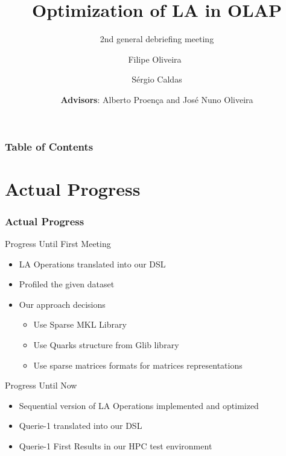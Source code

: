 \documentclass{beamer}
\title{Optimization of LA in OLAP}
\subtitle{2nd general debriefing meeting}
\author{ Filipe Oliveira\ \and Sérgio Caldas}
\date[UMinho, May 2016] %
  { \scriptsize \break \break \break \break 
\textbf{Advisors}: Alberto Proença and José Nuno Oliveira }
\begin{document}
\begin{frame}
  \titlepage
\end{frame}

\begin{frame}
\frametitle{Table of Contents}
\tableofcontents
\end{frame}

\section{Actual Progress}
\begin{frame}
\frametitle{Actual Progress}


\begin{block}{Progress Until First Meeting}

\begin{itemize}
    \item LA Operations translated into our DSL
    \item Profiled the given dataset
    \item Our approach decisions
    \begin{itemize}
        \item Use Sparse MKL Library
        \item Use Quarks structure from Glib library
        \item Use sparse matrices formats for matrices representations 
    \end{itemize}
\end{itemize}
\end{block}

\begin{block}{Progress Until Now}
\begin{itemize}
    \item Sequential version of LA Operations implemented and optimized
    \item Querie-1 translated into our DSL
    \item Querie-1 First Results in our HPC test environment
\end{itemize}
\end{block}
\end{frame}
\end{document}
